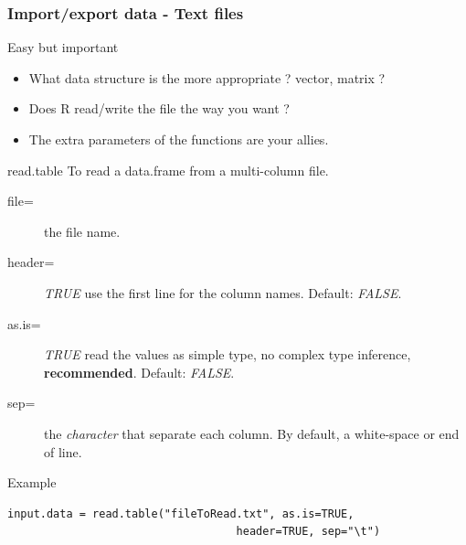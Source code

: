 \documentclass[10pt]{beamer}
\newenvironment{xframe}[2][]
  {\begin{frame}[fragile,environment=xframe,#1]
  \frametitle{#2}}
  {\end{frame}}
\begin{document}
\begin{xframe}[shrink=5]{Import/export data - Text files}
  \begin{block}{Easy but important}
    \begin{itemize}
    \item What data structure is the more appropriate ? {\sf vector}, {\sf matrix} ?
    \item Does R read/write the file the way you want ?
    \item The extra parameters of the functions are your allies.
    \end{itemize}
  \end{block}
  \begin{block}{{\sf read.table}}
    To read a {\sf data.frame} from a multi-column file.
    \begin{description}
    \item[file=] the file name.
    \item[header=] {\it TRUE} use the first line for the column names. Default: {\it FALSE}.
    \item[as.is=] {\it TRUE} read the values as simple type, no complex type inference, {\bf recommended}. Default: {\it FALSE}. 
    \item[sep=] the {\it character} that separate each column. By default, a white-space or end of line.
    \end{description}
  \end{block}
  \begin{exampleblock}{Example}
\begin{verbatim}
input.data = read.table("fileToRead.txt", as.is=TRUE,
                                   header=TRUE, sep="\t")
\end{verbatim}  
  \end{exampleblock}
\end{xframe}

\end{document}
